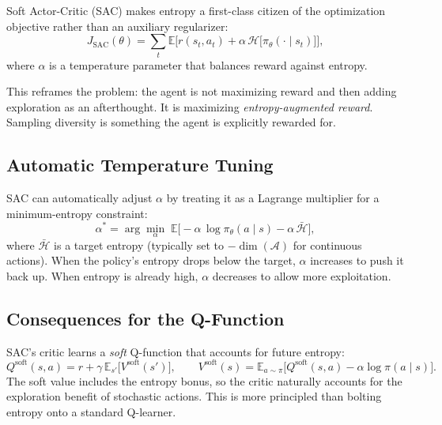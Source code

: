 Soft Actor-Critic (SAC) makes entropy a first-class citizen of the optimization objective rather than an auxiliary regularizer:
\begin{equation}
  J_{\text{SAC}}(\theta) = \sum_t \mathbb{E}\!\bigl[
    r(s_t, a_t) + \alpha\,\mathcal{H}\bigl[\pi_\theta(\cdot \mid s_t)\bigr]
  \bigr],
  \label{eq:sac-objective}
\end{equation}
where $\alpha$ is a temperature parameter that balances reward against entropy.

This reframes the problem: the agent is not maximizing reward and then adding exploration as an afterthought. It is maximizing \emph{entropy-augmented reward}. Sampling diversity is something the agent is explicitly rewarded for.

\subsection{Automatic Temperature Tuning}

SAC can automatically adjust $\alpha$ by treating it as a Lagrange multiplier for a minimum-entropy constraint:
\begin{equation}
  \alpha^* = \arg\min_\alpha\; \mathbb{E}\!\bigl[
    -\alpha\,\log\pi_\theta(a \mid s) - \alpha\,\bar{\mathcal{H}}
  \bigr],
\end{equation}
where $\bar{\mathcal{H}}$ is a target entropy (typically set to $-\dim(\mathcal{A})$ for continuous actions). When the policy's entropy drops below the target, $\alpha$ increases to push it back up. When entropy is already high, $\alpha$ decreases to allow more exploitation.

\subsection{Consequences for the Q-Function}

SAC's critic learns a \emph{soft} Q-function that accounts for future entropy:
\begin{equation}
  Q^{\text{soft}}(s,a) = r + \gamma\,\mathbb{E}_{s'}\!\bigl[
    V^{\text{soft}}(s')
  \bigr],
  \qquad
  V^{\text{soft}}(s) = \mathbb{E}_{a \sim \pi}\!\bigl[
    Q^{\text{soft}}(s,a) - \alpha\log\pi(a \mid s)
  \bigr].
\end{equation}
The soft value includes the entropy bonus, so the critic naturally accounts for the exploration benefit of stochastic actions. This is more principled than bolting entropy onto a standard Q-learner.


